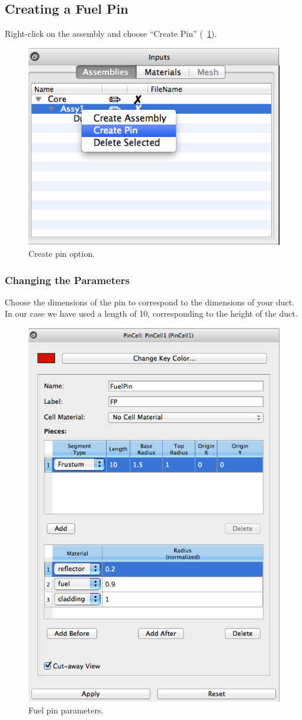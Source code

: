 \clearpage

\subsection{Creating a Fuel Pin}

Right-click on the assembly and choose ``Create Pin'' (~\ref{fig:rectCreatePin}).

\begin{figure}[htb]
\begin{center}
\includegraphics[width=0.5\linewidth]{Images/rect-create-pin-option.png}
\caption{Create pin option.}
\label{fig:rectCreatePin}
\end{center}
\end{figure}

\subsubsection{Changing the Parameters}

Choose the dimensions of the pin to correspond to the dimensions of your duct.  In our case we have used a length of 10, corresponding to the height of the duct.

\begin{figure}[htb]
\begin{center}
\includegraphics[width=0.4\linewidth]{Images/rect-pin-params.png}
\caption{Fuel pin parameters.}
\label{fig:Rect5}
\end{center}
\end{figure}

